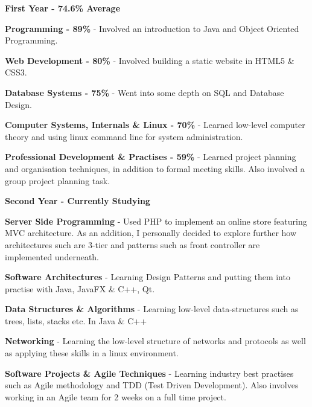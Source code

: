 \begin{cventries}
    {
      \begin{cvitems} %
        \item {\textbf{First Year - 74.6\% Average}} 
        \item {\textbf{Programming - 89\%} - Involved an introduction to Java and Object Oriented Programming.}
        \item {\textbf{Web Development - 80\%} - Involved building a static website in HTML5 \& CSS3.}
        \item {\textbf{Database Systems - 75\%} - Went into some depth on SQL and Database Design.}
        \item {\textbf{Computer Systems, Internals \& Linux - 70\%} - Learned low-level computer theory and using linux command line for system administration.}
        \item {\textbf{Professional Development \& Practises - 59\%} - Learned project planning and organisation techniques, in addition to formal meeting skills. Also involved a group project planning task.}
        \item {\textbf{Second Year - Currently Studying}} 
        \item {\textbf{Server Side Programming} - Used PHP to implement an online store featuring MVC architecture. As an addition, I personally decided to explore further how architectures such are 3-tier and patterns such as front controller are implemented underneath.}
        \item {\textbf{Software Architectures} - Learning Design Patterns and putting them into practise with Java, JavaFX \& C++, Qt.}
        \item {\textbf{Data Structures \& Algorithms} - Learning low-level data-structures such as trees, lists, stacks etc. In Java \& C++} 
        \item {\textbf{Networking} - Learning the low-level structure of networks and protocols as well as applying these skills in a linux environment.}
        \item {\textbf{Software Projects \& Agile Techniques} - Learning industry best practises such as Agile methodology and TDD (Test Driven Development). Also involves working in an Agile team for 2 weeks on a full time project.}
      \end{cvitems}
    }

\end{cventries}
